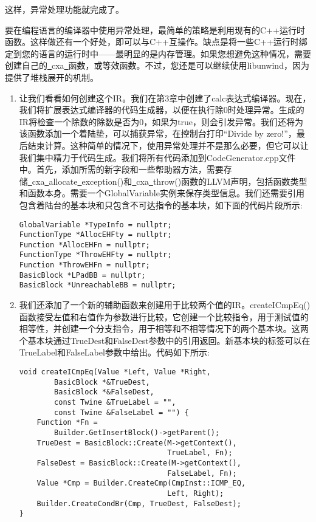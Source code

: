 这样，异常处理功能就完成了。\par

要在编程语言的编译器中使用异常处理，最简单的策略是利用现有的C++运行时函数。这样做还有一个好处，即可以与C++互操作。缺点是将一些C++运行时绑定到您的语言的运行时中——最明显的是内存管理。如果您想避免这种情况，需要创建自己的\underline{~}cxa\underline{~}函数，或等效函数。不过，您还是可以继续使用libunwind，因为提供了堆栈展开的机制。\par

\begin{enumerate}
\item 让我们看看如何创建这个IR。我们在第3章中创建了calc表达式编译器。现在，我们将扩展表达式编译器的代码生成器，以便在执行除0时处理异常。生成的IR将检查一个除数的除数是否为0，如果为true，则会引发异常。我们还将为该函数添加一个着陆垫，可以捕获异常，在控制台打印“Divide by zero!”，最后结束计算。这种简单的情况下，使用异常处理并不是那么必要，但它可以让我们集中精力于代码生成。我们将所有代码添加到CodeGenerator.cpp文件中。首先，添加所需的新字段和一些帮助器方法，需要存储\underline{~}cxa\underline{~}allocate\underline{~}exception()和\underline{~}cxa\underline{~}throw()函数的LLVM声明，包括函数类型和函数本身。需要一个GlobalVariable实例来保存类型信息。我们还需要引用包含着陆台的基本块和只包含不可达指令的基本块，如下面的代码片段所示:
\begin{lstlisting}[caption={}]
GlobalVariable *TypeInfo = nullptr;
FunctionType *AllocEHFty = nullptr;
Function *AllocEHFn = nullptr;
FunctionType *ThrowEHFty = nullptr;
Function *ThrowEHFn = nullptr;
BasicBlock *LPadBB = nullptr;
BasicBlock *UnreachableBB = nullptr;
\end{lstlisting}

\item 我们还添加了一个新的辅助函数来创建用于比较两个值的IR。createICmpEq()函数接受左值和右值作为参数进行比较，它创建一个比较指令，用于测试值的相等性，并创建一个分支指令，用于相等和不相等情况下的两个基本块。这两个基本块通过TrueDest和FalseDest参数中的引用返回。新基本块的标签可以在TrueLabel和FalseLabel参数中给出。代码如下所示:
\begin{lstlisting}[caption={}]
void createICmpEq(Value *Left, Value *Right,
		BasicBlock *&TrueDest,
		BasicBlock *&FalseDest,
		const Twine &TrueLabel = "",
		const Twine &FalseLabel = "") {
	Function *Fn =
		Builder.GetInsertBlock()->getParent();
	TrueDest = BasicBlock::Create(M->getContext(),
								  TrueLabel, Fn);
	FalseDest = BasicBlock::Create(M->getContext(),
								  FalseLabel, Fn);
	Value *Cmp = Builder.CreateCmp(CmpInst::ICMP_EQ,
								  Left, Right);
	Builder.CreateCondBr(Cmp, TrueDest, FalseDest);
}
\end{lstlisting}


\end{enumerate}
